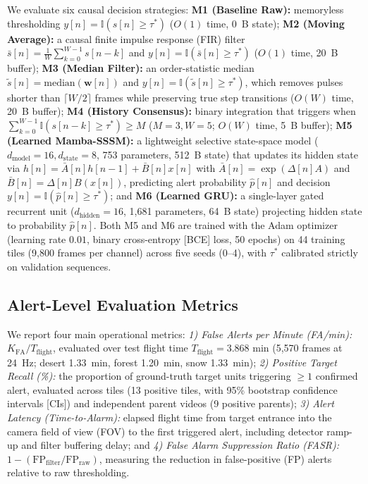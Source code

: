 \documentclass[conference]{IEEEtran}
\begin{document}
We evaluate six causal decision strategies:
\textbf{M1 (Baseline Raw):} memoryless thresholding $y[n] = \mathbb{I}(s[n] \ge \tau^*)$ ($O(1)$ time, 0~B state);
\textbf{M2 (Moving Average):} a causal finite impulse response (FIR) filter $\bar{s}[n] = \frac{1}{W}\sum_{k=0}^{W-1} s[n-k]$ and $y[n] = \mathbb{I}(\bar{s}[n] \ge \tau^*)$ ($O(1)$ time, 20~B buffer);
\textbf{M3 (Median Filter):} an order-statistic median $\tilde{s}[n] = \text{median}(\mathbf{w}[n])$ and $y[n] = \mathbb{I}(\tilde{s}[n] \ge \tau^*)$, which removes pulses shorter than $\lceil W/2 \rceil$ frames while preserving true step transitions ($O(W)$ time, 20~B buffer);
\textbf{M4 (History Consensus):} binary integration that triggers when $\sum_{k=0}^{W-1} \mathbb{I}(s[n-k] \ge \tau^*) \ge M$ ($M=3, W=5$; $O(W)$ time, 5~B buffer);
\textbf{M5 (Learned Mamba-SSSM):} a lightweight selective state-space model ($d_{\text{model}}=16, d_{\text{state}}=8$, 753 parameters, 512~B state) that updates its hidden state via $h[n]=\bar{A}[n]h[n-1]+\bar{B}[n]x[n]$ with $\bar{A}[n]=\exp(\Delta[n]A)$ and $\bar{B}[n]=\Delta[n]B(x[n])$, predicting alert probability $\hat{p}[n]$ and decision $y[n]=\mathbb{I}(\hat{p}[n]\ge \tau^*)$; and
\textbf{M6 (Learned GRU):} a single-layer gated recurrent unit ($d_{\text{hidden}}=16$, 1,681 parameters, 64~B state) projecting hidden state to probability $\hat{p}[n]$.
Both M5 and M6 are trained with the Adam optimizer (learning rate $0.01$, binary cross-entropy [BCE] loss, 50 epochs) on 44 training tiles (9,800 frames per channel) across five seeds (0--4), with $\tau^*$ calibrated strictly on validation sequences.

\subsection{Alert-Level Evaluation Metrics}
We report four main operational metrics:
\textit{1) False Alerts per Minute (FA/min):} $K_{\text{FA}} / T_{\text{flight}}$, evaluated over test flight time $T_{\text{flight}} = 3.868\text{ min}$ (5,570 frames at 24~Hz; desert 1.33~min, forest 1.20~min, snow 1.33~min);
\textit{2) Positive Target Recall (\%):} the proportion of ground-truth target units triggering $\ge 1$ confirmed alert, evaluated across tiles (13 positive tiles, with 95\% bootstrap confidence intervals [CIs]) and independent parent videos (9 positive parents);
\textit{3) Alert Latency (Time-to-Alarm):} elapsed flight time from target entrance into the camera field of view (FOV) to the first triggered alert, including detector ramp-up and filter buffering delay; and
\textit{4) False Alarm Suppression Ratio (FASR):} $1 - (\text{FP}_{\text{filter}} / \text{FP}_{\text{raw}})$, measuring the reduction in false-positive (FP) alerts relative to raw thresholding.
\end{document}
